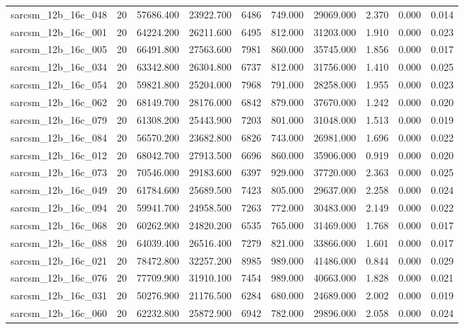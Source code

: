 \begin{tabular}{lrrrrrrrrr}
sarcsm\_12b\_16c\_048 & 20 & 57686.400 & 23922.700 & 6486 & 749.000 & 29069.000 & 2.370 & 0.000 & 0.014 \\
sarcsm\_12b\_16c\_001 & 20 & 64224.200 & 26211.600 & 6495 & 812.000 & 31203.000 & 1.910 & 0.000 & 0.023 \\
sarcsm\_12b\_16c\_005 & 20 & 66491.800 & 27563.600 & 7981 & 860.000 & 35745.000 & 1.856 & 0.000 & 0.017 \\
sarcsm\_12b\_16c\_034 & 20 & 63342.800 & 26304.800 & 6737 & 812.000 & 31756.000 & 1.410 & 0.000 & 0.025 \\
sarcsm\_12b\_16c\_054 & 20 & 59821.800 & 25204.000 & 7968 & 791.000 & 28258.000 & 1.955 & 0.000 & 0.023 \\
sarcsm\_12b\_16c\_062 & 20 & 68149.700 & 28176.000 & 6842 & 879.000 & 37670.000 & 1.242 & 0.000 & 0.020 \\
sarcsm\_12b\_16c\_079 & 20 & 61308.200 & 25443.900 & 7203 & 801.000 & 31048.000 & 1.513 & 0.000 & 0.019 \\
sarcsm\_12b\_16c\_084 & 20 & 56570.200 & 23682.800 & 6826 & 743.000 & 26981.000 & 1.696 & 0.000 & 0.022 \\
sarcsm\_12b\_16c\_012 & 20 & 68042.700 & 27913.500 & 6696 & 860.000 & 35906.000 & 0.919 & 0.000 & 0.020 \\
sarcsm\_12b\_16c\_073 & 20 & 70546.000 & 29183.600 & 6397 & 929.000 & 37720.000 & 2.363 & 0.000 & 0.025 \\
sarcsm\_12b\_16c\_049 & 20 & 61784.600 & 25689.500 & 7423 & 805.000 & 29637.000 & 2.258 & 0.000 & 0.024 \\
sarcsm\_12b\_16c\_094 & 20 & 59941.700 & 24958.500 & 7263 & 772.000 & 30483.000 & 2.149 & 0.000 & 0.022 \\
sarcsm\_12b\_16c\_068 & 20 & 60262.900 & 24820.200 & 6535 & 765.000 & 31469.000 & 1.768 & 0.000 & 0.017 \\
sarcsm\_12b\_16c\_088 & 20 & 64039.400 & 26516.400 & 7279 & 821.000 & 33866.000 & 1.601 & 0.000 & 0.017 \\
sarcsm\_12b\_16c\_021 & 20 & 78472.800 & 32257.200 & 8985 & 989.000 & 41486.000 & 0.844 & 0.000 & 0.029 \\
sarcsm\_12b\_16c\_076 & 20 & 77709.900 & 31910.100 & 7454 & 989.000 & 40663.000 & 1.828 & 0.000 & 0.021 \\
sarcsm\_12b\_16c\_031 & 20 & 50276.900 & 21176.500 & 6284 & 680.000 & 24689.000 & 2.002 & 0.000 & 0.019 \\
sarcsm\_12b\_16c\_060 & 20 & 62232.800 & 25872.900 & 6942 & 782.000 & 29896.000 & 2.058 & 0.000 & 0.024 \\

\end{tabular}
